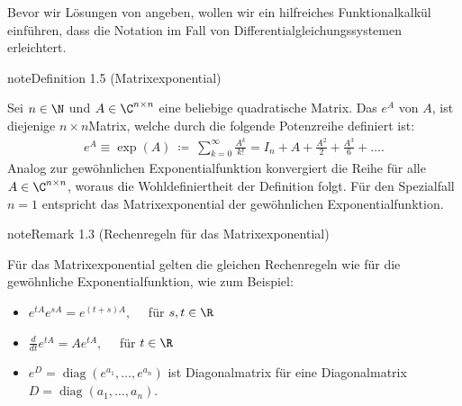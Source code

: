 \documentclass[letterpaper,10pt,english]{jupyterBook}
\begin{document}
\sphinxAtStartPar
Bevor wir Lösungen von {\hyperref[\detokenize{ode/repetition:equation-eq-lin-hom-dglsystem}]{}} angeben, wollen wir ein hilfreiches Funktionalkalkül einführen, dass die Notation im Fall von Differentialgleichungssystemen erleichtert.
\label{ode/repetition:definition-12}
\begin{sphinxadmonition}{note}{Definition 1.5 (Matrixexponential)}



\sphinxAtStartPar
Sei \(n \in \N\) und \(A \in \C^{n \times n}\) eine beliebige quadratische Matrix.
Das  \(e^A\) von \(A\), ist diejenige \(n\times n\)\sphinxhyphen{}Matrix, welche durch die folgende Potenzreihe definiert ist:
\begin{equation*}
\begin{split}e^A \equiv \exp(A) \ \coloneqq \ \sum_{k=0}^\infty \frac{A^k}{k!} = I_n + A + \frac{A^2}{2} + \frac{A^3}{6} + \ldots.\end{split}
\end{equation*}
\sphinxAtStartPar
Analog zur gewöhnlichen Exponentialfunktion konvergiert die Reihe für alle \(A \in \C^{n \times n}\), woraus die Wohldefiniertheit der Definition folgt.
Für den Spezialfall \(n=1\) entspricht das Matrixexponential der gewöhnlichen Exponentialfunktion.
\end{sphinxadmonition}
\label{ode/repetition:rem:matrixexponential_regeln}
\begin{sphinxadmonition}{note}{Remark 1.3 (Rechenregeln für das Matrixexponential)}



\sphinxAtStartPar
Für das Matrixexponential gelten die gleichen Rechenregeln wie für die gewöhnliche Exponentialfunktion, wie zum Beispiel:
\begin{itemize}
\item {} 
\sphinxAtStartPar
\(e^{tA}e^{sA} = e^{(t+s)A}, \quad\) für \(s,t \in \R\)

\item {} 
\sphinxAtStartPar
\(\frac{d}{dt} e^{tA} = Ae^{tA}, \quad\) für \(t \in \R\)

\item {} 
\sphinxAtStartPar
\( e^{D} = \operatorname{diag}(e^{a_1}, \ldots, e^{a_n})\) ist Diagonalmatrix für eine Diagonalmatrix \(D = \operatorname{diag}(a_1, \ldots, a_n)\).

\end{itemize}
\end{sphinxadmonition}
\end{document}
